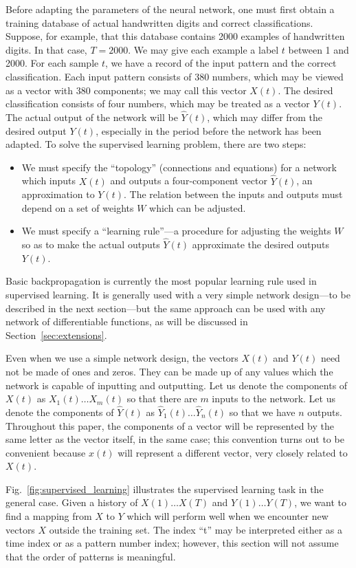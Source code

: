 \documentclass[journal]{IEEEtran} %
\begin{document}
Before adapting the parameters of the neural network, one must first obtain a training database of actual handwritten digits and correct classifications. Suppose, for example, that this database contains 2000 examples of handwritten digits. In that case, $T = 2000$. We may give each example a label $t$ between 1 and 2000. For each sample $t$, we have a record of the input pattern and the correct classification. Each input pattern consists of 380 numbers, which may be viewed as a vector with 380 components; we may call this vector $X(t)$. The desired classification consists of four numbers, which may be treated as a vector $Y(t)$. The actual output of the network will be $\hat{Y}(t)$, which may differ from the desired output $Y(t)$, especially in the period before the network has been adapted. To solve the supervised learning problem, there are two steps:
\begin{itemize}
    \item We must specify the ``topology'' (connections and equations) for a network which inputs $X(t)$ and outputs a four-component vector $\hat{Y}(t)$, an approximation to $Y(t)$. The relation between the inputs and outputs must depend on a set of weights $W$ which can be adjusted.
    \item We must specify a ``learning rule''---a procedure for adjusting the weights $W$ so as to make the actual outputs $\hat{Y}(t)$ approximate the desired outputs $Y(t)$.
\end{itemize}
Basic backpropagation is currently the most popular learning rule used in supervised learning. It is generally used with a very simple network design---to be described in the next section---but the same approach can be used with any network of differentiable functions, as will be discussed in Section~\ref{sec:extensions}.

Even when we use a simple network design, the vectors $X(t)$ and $Y(t)$ need not be made of ones and zeros. They can be made up of any values which the network is capable of inputting and outputting. Let us denote the components of $X(t)$ as $X_1(t) \dots X_m(t)$ so that there are $m$ inputs to the network. Let us denote the components of $\hat{Y}(t)$ as $\hat{Y}_1(t) \dots \hat{Y}_n(t)$ so that we have $n$ outputs. Throughout this paper, the components of a vector will be represented by the same letter as the vector itself, in the same case; this convention turns out to be convenient because $x(t)$ will represent a different vector, very closely related to $X(t)$.

Fig.~\ref{fig:supervised_learning} illustrates the supervised learning task in the general case. Given a history of $X(1) \dots X(T)$ and $Y(1) \dots Y(T)$, we want to find a mapping from $X$ to $Y$ which will perform well when we encounter new vectors $X$ outside the training set. The index ``t'' may be interpreted either as a time index or as a pattern number index; however, this section will not assume that the order of patterns is meaningful.
\end{document}
